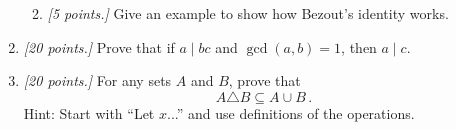 \documentclass[12pt]{amsart}
\begin{document}
\begin{enumerate}[label=\arabic*.,itemsep=10pt, leftmargin=*]
\begin{enumerate}
		            \vspace{4cm}
		      \item \textit{[5 points.]} Give an example to show how Bezout's identity works.

	      \end{enumerate}

	      \newpage

	\item \textit{[20 points.]} Prove that if $a \mid bc$ and $\gcd(a,b) = 1$, then $a \mid c$.

	      \newpage

	\item \textit{[20 points.]} For any sets $A$ and $B$, prove that
	      \begin{equation*}
		      A \triangle B \subseteq A \cup B \,.
	      \end{equation*}
	      Hint: Start with ``Let $x$...'' and use definitions of the operations.

\end{enumerate}



\printbibliography
%
%
\end{document}
